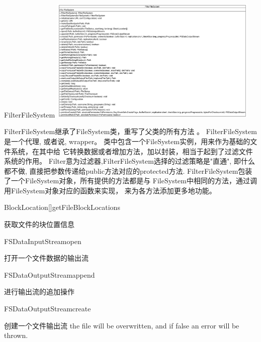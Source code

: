 \begin{XeClass}{FilterFileSystem}
\includegraphics[width=10cm]{cdig/FilterFileSystem.png}
     
 FilterFileSystem继承了FileSystem类，重写了父类的所有方法 。
 FilterFileSystem是一个代理, 或者说, wrapper。
 类中包含一个FileSystem实例，用来作为基础的文件系统，在其中给
 它转换数据或者增加方法，加以封装，相当于起到了过滤文件系统的作用。
 Filter意为过滤器,FilterFileSystem选择的过滤策略是"直通",
 即什么都不做, 直接把参数传递给public方法对应的protected方法.
 FilterFileSystem包装了一个FileSystem对象，所有提供的方法都是与
 FileSystem中相同的方法，通过调用FileSystem对象对应的函数来实现，
 来为各方法添加更多地功能。

    \begin{XeMethod}{\XePublic}{BlockLocation[]}{getFileBlockLocations}
         
 获取文件的块位置信息

    \end{XeMethod}

    \begin{XeMethod}{\XePublic}{FSDataInputStream}{open}
         
 打开一个文件数据的输出流

    \end{XeMethod}

    \begin{XeMethod}{\XePublic}{FSDataOutputStream}{append}
         
 进行输出流的追加操作

    \end{XeMethod}

    \begin{XeMethod}{\XePublic}{FSDataOutputStream}{create}
         
 创建一个文件输出流
 the file will be overwritten, and if false an error will be thrown.

    \end{XeMethod}


\end{XeClass}
